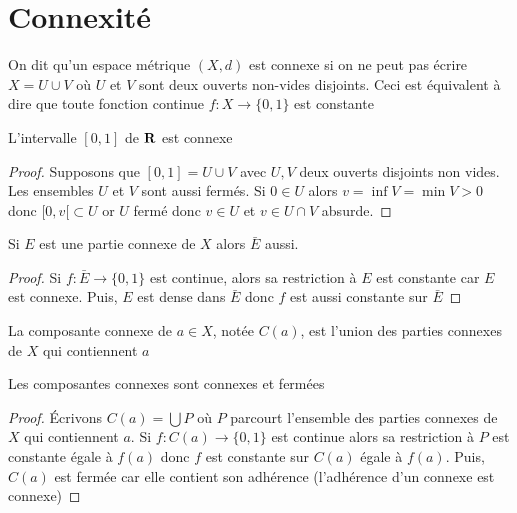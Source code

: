 \section{Connexité}

\begin{dfn}
    On dit qu'un espace métrique $(X, d)$ est connexe si on ne peut pas écrire  $X=U\cup V$ où  $U$ et  $V$ sont deux ouverts non-vides disjoints. Ceci est équivalent à dire que toute fonction continue  $f: X \longrightarrow \{0,1\}$ est constante
\end{dfn}

\begin{thm}
    L'intervalle $[0,1]$ de  $\mathbf R$ est connexe
\end{thm}

\begin{proof}
    Supposons que $[0,1]=U\cup V$ avec  $U,V$ deux ouverts disjoints non vides. Les ensembles  $U$ et  $V$ sont aussi fermés. Si  $0 \in  U$ alors $v=\inf V=\min V>0$ donc  $[0,v[\subset U$ or  $U$ fermé donc  $v \in  U$ et $v \in  U\cap V$ absurde.
\end{proof}

\begin{prop}
Si $E$ est une partie connexe de $X$ alors $ \bar{E} $ aussi.
\end{prop}

\begin{proof}
    Si $f: \bar{E} \longrightarrow \{0,1\}$ est continue, alors sa restriction à $E$ est constante car  $E$ est connexe. Puis,  $E$ est dense dans $ \bar{E} $ donc $f$ est aussi constante sur  $\bar{E} $
\end{proof}

\begin{dfn}
    La composante connexe de $a \in  X$, notée $C(a)$, est l'union des parties connexes de  $X$ qui contiennent  $a$
\end{dfn}

\begin{thm}
Les composantes connexes sont connexes et fermées
\end{thm}

\begin{proof}
    Écrivons $C(a)=\bigcup P$ où  $P$ parcourt l'ensemble des parties connexes de  $X$ qui contiennent  $a$. Si  $f:C(a)\longrightarrow \{0,1\}$ est continue alors sa restriction à $P$ est constante égale à  $f(a)$ donc  $f$ est constante sur  $C(a)$ égale à  $f(a)$. Puis,  $C(a)$ est fermée car elle contient son adhérence (l'adhérence d'un connexe est connexe)
\end{proof}

